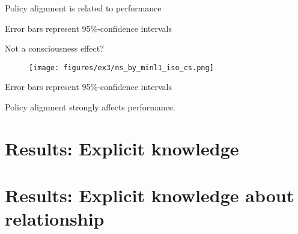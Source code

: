 \documentclass{beamer}
\begin{document}
\begin{frame}{Policy alignment is related to performance}
\begin{figure}
\centering
{}
\end{figure}
{\scriptsize Error bars represent 95\%-confidence intervals}
\end{frame}

\begin{frame}{Not a consciousness effect?}
\begin{figure}
\centering
\texttt{[image: figures/ex3/ns\_by\_minl1\_iso\_cs.png]}
\end{figure}
{\scriptsize Error bars represent 95\%-confidence intervals}
\end{frame}

\begin{frame}[standout]
Policy alignment strongly affects performance. \par
{}
\end{frame}

\section{Results: Explicit knowledge}


\section{Results: Explicit knowledge about relationship}
\end{document}

